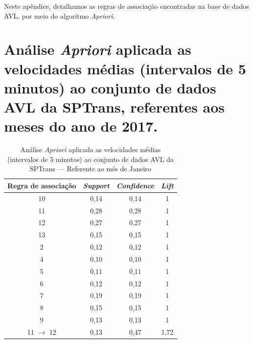 \documentclass[
	12pt,				%
	oneside,			%
	a4paper,			%
	english,			%
	brazil				%
	]{abntex2ppgsi}
\begin{document}
{{\begin{apendicesenv}
Neste apêndice, detalhamos as regras de associação encontradas na base de dados AVL, por meio do algoritmo \textit{Apriori}.

\section{Análise \textit{Apriori} aplicada as velocidades médias (intervalos de 5 minutos) ao conjunto de dados AVL da SPTrans, referentes aos meses do ano de 2017.}
\label{g1}

\begin{table}[!htb]
\centering
\caption {Análise \textit{Apriori} aplicada as velocidades médias (intervalos de 5 minutos) ao conjunto de dados AVL da SPTrans --- Referente ao mês de Janeiro}
\label {tab:aprioriJanuary}
\begin{tabular}{c|c|c|c}
\toprule
\textbf{Regra de associação} & \textit{\textbf{Support}} & \textit{\textbf{Confidence}} & \textit{\textbf{Lift}} \\
\midrule
10 &  0,14 &  0,14 &  1\\
\hline
11 &  0,28 &  0,28 &  1\\
\hline
12 &  0,27 &  0,27 &  1\\
\hline
13 &  0,15 &  0,15 &  1\\
\hline
2 &  0,12 &  0,12&  1\\
\hline
4 &  0,10&  0,10 &  1\\
\hline
5 &  0,11 &  0,11 &  1\\
\hline
6 &  0,12 &  0,12 &  1\\
\hline
7 &  0,19 &  0,19 &  1\\
\hline
8 &  0,15 &  0,15&  1\\
\hline
9 &  0,13 &  0,13 &  1\\
\hline
11 $\rightarrow$ 12 &  0,13 &  0,47&  1,72\\
\bottomrule
\end{tabular}
\end{table}


\end{apendicesenv}}}
\end{document}
